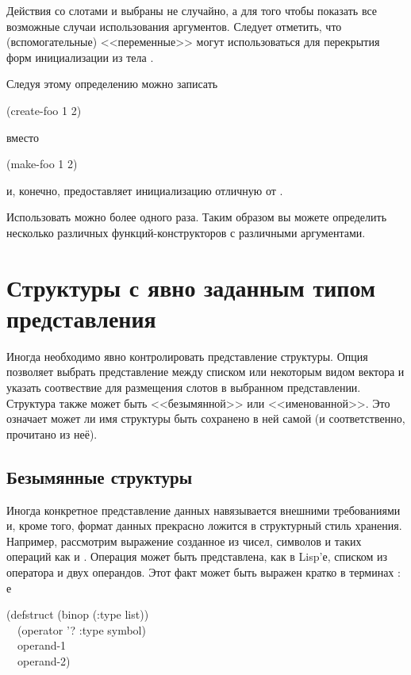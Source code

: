 Действия со слотами  и  выбраны не случайно, а для того чтобы
показать все возможные случаи использования аргументов.
Следует отметить, что  (вспомогательные) <<переменные>> могут
использоваться для перекрытия форм инициализации из тела .

Следуя этому определению можно записать
\begin{lisp}
(create-foo 1 2)
\end{lisp}
вместо
\begin{lisp}
(make-foo  1  2)
\end{lisp}
и, конечно,  предоставляет инициализацию отличную от
.

Использовать  можно более одного раза. Таким образом вы можете
определить несколько различных функций-конструкторов с различными аргументами.

\section{Структуры с явно заданным типом представления}
\label{EXPLICIT-TYPE-STRUCTURES}

Иногда необходимо явно контролировать представление структуры. Опция 
позволяет выбрать представление между списком или некоторым видом вектора и
указать соотвествие для размещения слотов в выбранном представлении.
Структура также может быть <<безымянной>> или <<именованной>>. Это означает
может ли имя структуры быть сохранено в ней самой (и соответственно, прочитано
из неё).

\subsection{Безымянные структуры}

Иногда конкретное представление данных навязывается внешними требованиями и,
кроме того, формат данных прекрасно ложится в структурный стиль хранения.
Например, рассмотрим выражение созданное из чисел, символов и таких операций как
\cdf{+} и \cdf{*}. Операция может быть представлена, как в Lisp'е, списком из
оператора и двух операндов. Этот факт может быть выражен кратко в терминах
:
е\begin{lisp}
(defstruct (binop (:type list)) \\
~~(operator '? :type symbol) \\
~~operand-1 \\
~~operand-2)
\end{lisp}

